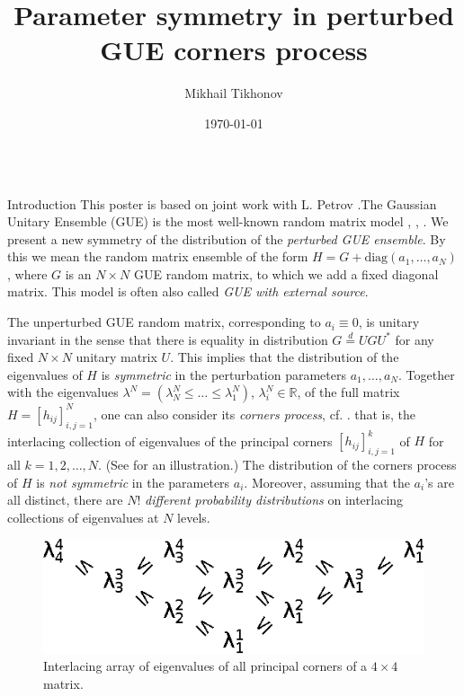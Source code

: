 \documentclass[english,final,t]{beamer}
\title{\huge Parameter symmetry in perturbed GUE corners process}
\author[Tikhonov]{Mikhail Tikhonov}
\institute[University of Virginia, IITP]{Department of Mathematics, University of Virginia and Institute for Information Transmission Problems}
\date{\today}
\begin{document}
\begin{frame}{}
    \begin{columns}[t]
        \begin{column}{.26\linewidth}

            \begin{block}{Introduction}
\justifying
This poster is based on joint work with L. Petrov \cite{PetrovTikhonov2020}.The Gaussian Unitary Ensemble (GUE) is the most 
well-known random matrix model
\cite{mehta2004random}, 
\cite{Forrester-LogGas}, \cite{AndersonGuionnetZeitouniBook}.
We present a new symmetry
of the distribution of the \emph{perturbed GUE
ensemble}. By this we mean the random matrix ensemble
of the form $H=G+\mathrm{diag}(a_1,\ldots,a_N)$, where $G$ is an $N\times N$
GUE random matrix, to which we add a fixed diagonal matrix. 
This model is often also called \emph{GUE with external source}.

The unperturbed GUE random matrix, corresponding to $a_i\equiv 0$,
is unitary invariant
in the sense that there is 
equality in distribution
$G\stackrel{d}{=}UGU^*$ for 
any fixed $N\times N$ unitary matrix $U$.
This implies that the distribution of the eigenvalues of 
$H$ is \emph{symmetric} in the perturbation parameters $a_1,\ldots,a_N $.
Together with the eigenvalues $\lambda^N=(\lambda^N_N\le \ldots\le\lambda^N_1 )$,
$\lambda^N_i\in \mathbb{R}$,
of the full matrix $H=[h_{ij}]_{i,j=1}^{N}$, 
one can also
consider its
\emph{corners process},
cf. \cite{johansson2006eigenvalues}.
that is, the interlacing collection of eigenvalues
of the principal corners
$[h_{ij}]_{i,j=1}^{k}$ of $H$ for all $k=1,2,\ldots,N $.
(See  for an illustration.)
The distribution of the corners process of $H$ is 
\emph{not symmetric} in the parameters $a_i$.
Moreover, assuming that the $a_i$'s are 
all distinct, there are $N!$ \emph{different probability
distributions} on 
interlacing collections of eigenvalues
at $N$ levels. 

\begin{figure}[htpb]
	\centering
	\includegraphics[width=.55\textwidth]{fig_interlace}
	\caption{Interlacing array of eigenvalues
	of all principal corners of a $4\times 4$ matrix.}
	\label{fig:interlace}
\end{figure}


\end{block}
\end{column}
\end{columns}
\end{frame}
\end{document}
